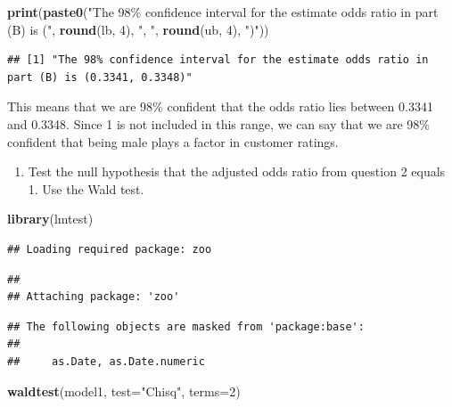 \documentclass[
]{article}
\newenvironment{Shaded}{\begin{snugshade}}{\end{snugshade}}
\newcommand{\AttributeTok}[1]{\textcolor[rgb]{0.13,0.29,0.53}{#1}}
\newcommand{\DecValTok}[1]{\textcolor[rgb]{0.00,0.00,0.81}{#1}}
\newcommand{\FunctionTok}[1]{\textcolor[rgb]{0.13,0.29,0.53}{\textbf{#1}}}
\newcommand{\NormalTok}[1]{#1}
\newcommand{\StringTok}[1]{\textcolor[rgb]{0.31,0.60,0.02}{#1}}
\providecommand{\tightlist}{%
  \setlength{\itemsep}{0pt}\setlength{\parskip}{0pt}}
\begin{document}
\begin{Shaded}
\begin{Highlighting}[]
\FunctionTok{print}\NormalTok{(}\FunctionTok{paste0}\NormalTok{(}\StringTok{"The 98\% confidence interval for the estimate odds ratio in part (B) is ("}\NormalTok{, }\FunctionTok{round}\NormalTok{(lb, }\DecValTok{4}\NormalTok{), }\StringTok{", "}\NormalTok{, }\FunctionTok{round}\NormalTok{(ub, }\DecValTok{4}\NormalTok{), }\StringTok{")"}\NormalTok{))}
\end{Highlighting}
\end{Shaded}

\begin{verbatim}
## [1] "The 98% confidence interval for the estimate odds ratio in part (B) is (0.3341, 0.3348)"
\end{verbatim}

This means that we are 98\% confident that the odds ratio lies between
0.3341 and 0.3348. Since 1 is not included in this range, we can say
that we are 98\% confident that being male plays a factor in customer
ratings.

\newpage

\begin{enumerate}
\def\labelenumi{\arabic{enumi}.}
\setcounter{enumi}{3}
\tightlist
\item
  Test the null hypothesis that the adjusted odds ratio from question 2
  equals 1. Use the Wald test.
\end{enumerate}

\begin{Shaded}
\begin{Highlighting}[]
\FunctionTok{library}\NormalTok{(lmtest)}
\end{Highlighting}
\end{Shaded}

\begin{verbatim}
## Loading required package: zoo
\end{verbatim}

\begin{verbatim}
## 
## Attaching package: 'zoo'
\end{verbatim}

\begin{verbatim}
## The following objects are masked from 'package:base':
## 
##     as.Date, as.Date.numeric
\end{verbatim}

\begin{Shaded}
\begin{Highlighting}[]
\FunctionTok{waldtest}\NormalTok{(model1, }\AttributeTok{test=}\StringTok{"Chisq"}\NormalTok{, }\AttributeTok{terms=}\DecValTok{2}\NormalTok{)}
\end{Highlighting}
\end{Shaded}
\end{document}
